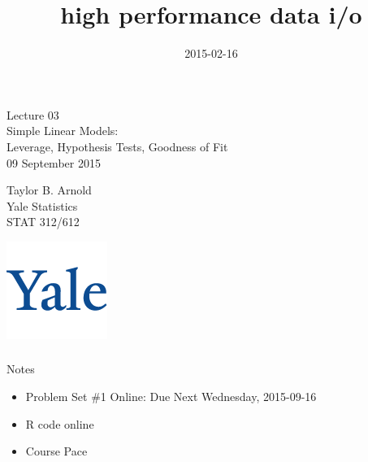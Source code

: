 

\title{high performance data i/o}
\date{2015-02-16}



\begin{frame}[fragile] \frametitle{}

\vfill

{\fontsize{0.7cm}{0cm}\selectfont Lecture 03 \\\vspace{0.2cm} Simple Linear Models:\\
Leverage, Hypothesis Tests, Goodness of Fit}\\\vspace{0.5cm}
09 September 2015

\vspace{2cm}

\begin{minipage}{0.6\textwidth}
Taylor B. Arnold \\
Yale Statistics \\
STAT 312/612
\end{minipage}
\hfill
\begin{minipage}{0.3\textwidth}\raggedleft
\includegraphics[scale=0.3]{../yale-logo.png}
\end{minipage}%

\end{frame}


\begin{frame}[fragile] \frametitle{}

{\color{yaleblue}\fontsize{16pt}{20pt}\selectfont Notes}

\begin{itemize}
\item Problem Set \#1 Online: Due Next Wednesday, 2015-09-16
\item R code online
\item Course Pace
\end{itemize}

\end{frame}


